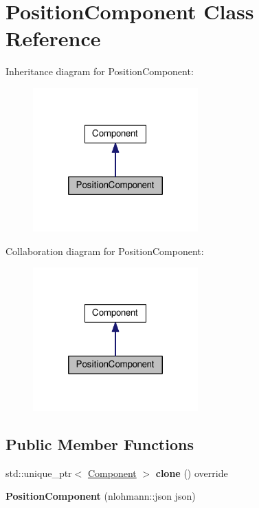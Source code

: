 \hypertarget{classPositionComponent}{\section{Position\-Component Class Reference}
\label{classPositionComponent}
}


Inheritance diagram for Position\-Component\-:
\nopagebreak
\begin{figure}[H]
\begin{center}
\leavevmode
\includegraphics[width=180pt]{classPositionComponent__inherit__graph}
\end{center}
\end{figure}


Collaboration diagram for Position\-Component\-:
\nopagebreak
\begin{figure}[H]
\begin{center}
\leavevmode
\includegraphics[width=180pt]{classPositionComponent__coll__graph}
\end{center}
\end{figure}
\subsection*{Public Member Functions}
\begin{DoxyCompactItemize}
\item 
\hypertarget{classPositionComponent_ae04209639f07bee7be1fef2731262851}{std\-::unique\-\_\-ptr$<$ \hyperlink{classComponent}{Component} $>$ {\bfseries clone} () override}\label{classPositionComponent_ae04209639f07bee7be1fef2731262851}

\item 
\hypertarget{classPositionComponent_ab884ac96dc85424de2adb3423a76cc95}{{\bfseries Position\-Component} (nlohmann\-::json json)}\label{classPositionComponent_ab884ac96dc85424de2adb3423a76cc95}

\end{DoxyCompactItemize}
